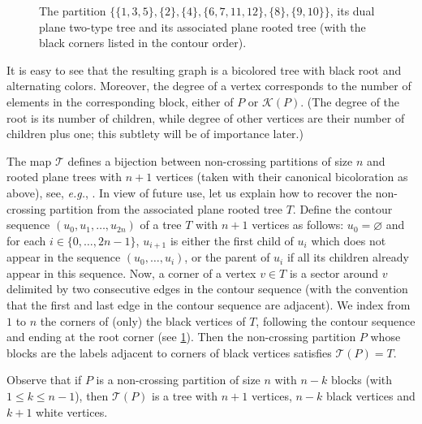 \documentclass[10pt]{amsart}
\theoremstyle{definition}\newtheorem{defi}[theo]{Definition}\newtheorem{rema}[theo]{Remark}\newtheorem{exam}[theo]{Example}\newtheorem{exem}[theo]{Example}\newtheorem{nota}[theo]{Notation}
\def\TTT{\mathcal T}
\begin{document}
\begin{figure}[t]
\begin{scriptsize}
\end{scriptsize}
\caption{The partition $\{\{1, 3, 5\}, \{2\}, \{4\}, \{6, 7, 11, 12\}, \{8\}, \{9, 10\}\}$, its dual plane two-type tree and its associated plane rooted tree (with the black corners listed in the contour order). }
\label{fig:nc}
\end{figure}

It is easy to see that the resulting graph is a bicolored tree with black root and alternating colors.
Moreover, the degree of a vertex corresponds to the number of elements in the corresponding block,
either of $P$ or $\mathcal K(P)$. (The degree of the root is its number of children, while degree
of other vertices are their number of children plus one; this subtlety will be of importance later.)


The map $\TTT$ defines a bijection between non-crossing partitions of size $n$
and rooted plane trees with $n+1$ vertices (taken with their canonical bicoloration as above), see, {\em e.g.}, \cite{KM17}.
In view of future use, let us  explain how to recover the non-crossing partition from the associated plane rooted tree $T$. Define the contour sequence $(u_0, u_1, \dots ,u_{2n})$ of a tree $T$  with $n+1$ vertices as follows: $u_0 = \varnothing$ and for each $i \in \{0, \dots, 2n-1\}$, $u_{i+1}$ is either the first child of $u_i$ which does not appear in the sequence $(u_0, \dots, u_i)$, or the parent of $u_i$ if all its children already appear in this sequence. Now, a corner of a vertex $v \in T$ is a sector around $v$ delimited by two consecutive edges in the contour sequence (with the convention that the first and last edge in the contour sequence are adjacent). We index from $1$ to $n$ the corners of (only) the black vertices of $T$, following the contour sequence and ending at the root corner (see \cref{fig:nc}). Then the non-crossing partition $P$ whose blocks are the labels adjacent to corners of black vertices satisfies $\mathcal{T}(P)=T$.

Observe that if $P$ is a non-crossing partition of size $n$ with $n-k$ blocks (with $1 \leq k \leq n-1$), then $ \mathcal{T}(P)$ is a tree with $n+1$ vertices,  $n-k$ black vertices and $k+1$ white vertices.
\end{document}
